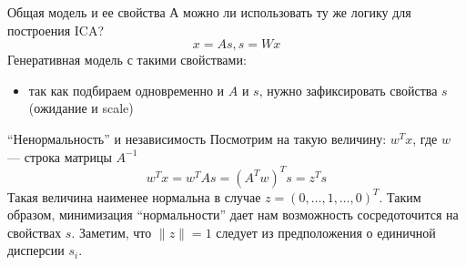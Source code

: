 \documentclass[14pt, fleqn, xcolor={dvipsnames, table}]{beamer}
\begin{document}
\begin{frame}{Общая модель и ее свойства}
\small
А можно ли использовать ту же логику для построения ICA?
$$
x = As, s = Wx
$$
Генеративная модель с такими свойствами:
\begin{itemize}\footnotesize
  \item так как подбираем одновременно и $A$ и $s$, нужно зафиксировать свойства $s$ (ожидание и scale)
\end{itemize}
\end{frame}

\begin{frame}{``Ненормальность'' и независимость}
Посмотрим на такую величину: $w^T x$, где $w$ --- строка матрицы $A^{-1}$
$$
w^T x = w^T As = (A^T w)^T s = z^T s
$$
Такая величина наименее нормальна в случае $z = (0,\ldots,1,\ldots,0)^T$. Таким образом, минимизация ``нормальности'' дает нам возможность сосредоточится на свойствах $s$. Заметим, что $\|z\| = 1$ следует из предположения о единичной дисперсии $s_i$.
\end{frame}
\end{document}
